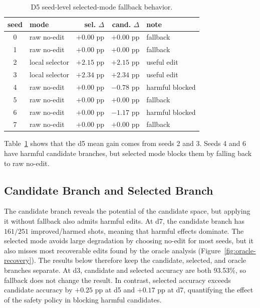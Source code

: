 \documentclass[aps,prd,12pt,twocolumn,superscriptaddress,floatfix,longbibliography]{revtex4-2}
\newcommand{\thesiscaptionfont}{\footnotesize}
\begin{document}
\begin{table}[!tbp]
\caption{\thesiscaptionfont D5 seed-level selected-mode fallback behavior.}
\label{tab:d5-fallback}
\centering
\scriptsize
\setlength{\tabcolsep}{2.4pt}
\begin{tabular*}{\columnwidth}{@{\extracolsep{\fill}}clrrl}
\toprule
seed & mode & sel. \(\Delta\) & cand. \(\Delta\) & note \\
\midrule
0 & raw no-edit & \(+0.00\) pp & \(+0.00\) pp & fallback \\
1 & raw no-edit & \(+0.00\) pp & \(+0.00\) pp & fallback \\
2 & local selector & \(+2.15\) pp & \(+2.15\) pp & useful edit \\
3 & local selector & \(+2.34\) pp & \(+2.34\) pp & useful edit \\
4 & raw no-edit & \(+0.00\) pp & \(-0.78\) pp & harmful blocked \\
5 & raw no-edit & \(+0.00\) pp & \(+0.00\) pp & fallback \\
6 & raw no-edit & \(+0.00\) pp & \(-1.17\) pp & harmful blocked \\
7 & raw no-edit & \(+0.00\) pp & \(+0.00\) pp & fallback \\
\bottomrule
\end{tabular*}
\end{table}

Table~\ref{tab:d5-fallback} shows that the d5 mean gain comes from seeds 2 and
3. Seeds 4 and 6 have harmful candidate branches, but selected mode blocks
them by falling back to raw no-edit.

\subsection{Candidate Branch and Selected Branch}

The candidate branch reveals the potential of the candidate space, but applying
it without fallback also admits harmful edits. At d7, the candidate branch has
\(161/251\) improved/harmed shots, meaning that harmful effects dominate. The
selected mode avoids large degradation by choosing no-edit for most seeds, but
it also misses most recoverable edits found by the oracle analysis
(Figure~\ref{fig:oracle-recovery}). The results
below therefore keep the candidate, selected, and oracle branches separate.
At d3, candidate and selected accuracy are both 93.53\%, so fallback does not
change the result. In contrast, selected accuracy exceeds candidate accuracy by
\(+0.25\) pp at d5 and \(+0.17\) pp at d7, quantifying the effect of the safety
policy in blocking harmful candidates.
\end{document}
